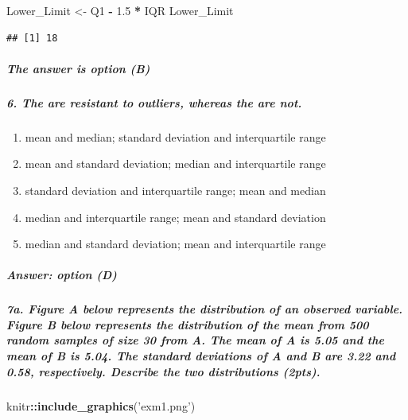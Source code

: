 \documentclass[]{article}
\newenvironment{Shaded}{\begin{snugshade}}{\end{snugshade}}
\newcommand{\KeywordTok}[1]{\textcolor[rgb]{0.13,0.29,0.53}{\textbf{#1}}}
\newcommand{\FloatTok}[1]{\textcolor[rgb]{0.00,0.00,0.81}{#1}}
\newcommand{\StringTok}[1]{\textcolor[rgb]{0.31,0.60,0.02}{#1}}
\newcommand{\OperatorTok}[1]{\textcolor[rgb]{0.81,0.36,0.00}{\textbf{#1}}}
\newcommand{\NormalTok}[1]{#1}
\providecommand{\tightlist}{%
  \setlength{\itemsep}{0pt}\setlength{\parskip}{0pt}}
\let\oldsubparagraph\subparagraph
\renewcommand{\subparagraph}[1]{\oldsubparagraph{#1}\mbox{}}
\begin{document}
\begin{Shaded}
\begin{Highlighting}[]
\NormalTok{Lower_Limit <-}\StringTok{ }\NormalTok{Q1 }\OperatorTok{-}\StringTok{ }\FloatTok{1.5} \OperatorTok{*}\StringTok{ }\NormalTok{IQR}
\NormalTok{Lower_Limit}
\end{Highlighting}
\end{Shaded}

\begin{verbatim}
## [1] 18
\end{verbatim}

\subparagraph{The answer is option (B)}\label{the-answer-is-option-b}

\subparagraph{6. The are resistant to outliers, whereas the are
not.}\label{the-are-resistant-to-outliers-whereas-the-are-not.}

\begin{enumerate}
\def\labelenumi{\alph{enumi}.}
\tightlist
\item
  mean and median; standard deviation and interquartile range
\item
  mean and standard deviation; median and interquartile range
\item
  standard deviation and interquartile range; mean and median
\item
  median and interquartile range; mean and standard deviation
\item
  median and standard deviation; mean and interquartile range
\end{enumerate}

\subparagraph{Answer: option (D)}\label{answer-option-d}

\subparagraph{7a. Figure A below represents the distribution of an
observed variable. Figure B below represents the distribution of the
mean from 500 random samples of size 30 from A. The mean of A is 5.05
and the mean of B is 5.04. The standard deviations of A and B are 3.22
and 0.58, respectively. Describe the two distributions
(2pts).}\label{a.-figure-a-below-represents-the-distribution-of-an-observed-variable.-figure-b-below-represents-the-distribution-of-the-mean-from-500-random-samples-of-size-30-from-a.-the-mean-of-a-is-5.05-and-the-mean-of-b-is-5.04.-the-standard-deviations-of-a-and-b-are-3.22-and-0.58-respectively.-describe-the-two-distributions-2pts.}

\begin{Shaded}
\begin{Highlighting}[]
\NormalTok{knitr}\OperatorTok{::}\KeywordTok{include_graphics}\NormalTok{(}\StringTok{'exm1.png'}\NormalTok{)}
\end{Highlighting}
\end{Shaded}
\end{document}
